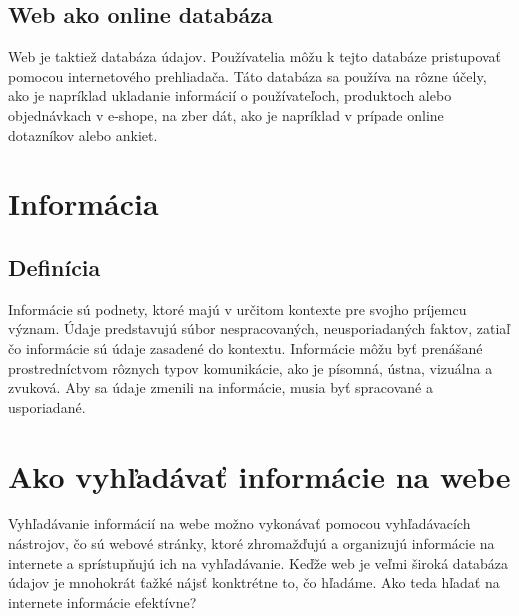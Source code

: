 \documentclass[10pt,twoside,slovak,a4paper]{article}
\begin{document}
\subsection{Web ako online databáza}
Web je taktiež databáza údajov. Používatelia môžu k tejto databáze pristupovať pomocou internetového prehliadača. Táto databáza sa používa na rôzne účely, ako je napríklad ukladanie informácií o používateľoch, produktoch alebo objednávkach v e-shope, na zber dát, ako je napríklad v prípade online dotazníkov alebo ankiet. \cite{williams2004web}

\section{Informácia} 
\label{informacia}
\subsection{Definícia}
Informácie sú podnety, ktoré majú v určitom kontexte pre svojho príjemcu význam. Údaje predstavujú súbor nespracovaných, neusporiadaných faktov, zatiaľ čo informácie sú údaje zasadené do kontextu. Informácie môžu byť prenášané prostredníctvom rôznych typov komunikácie, ako je písomná, ústna, vizuálna a zvuková. Aby sa údaje zmenili na informácie, musia byť spracované a usporiadané. \cite{webster1984longman}


\section{Ako vyhľadávať informácie na webe}
\label{vyhladavanie}
Vyhľadávanie informácií na webe možno vykonávať pomocou vyhľadávacích nástrojov, čo sú webové stránky, ktoré zhromažďujú a organizujú informácie na internete a sprístupňujú ich na vyhľadávanie. Keďže web je veľmi široká databáza údajov je mnohokrát ťažké nájsť konktrétne to, čo hľadáme. Ako teda hľadať na internete informácie efektívne? \cite{inkpen2007information}
\end{document}
